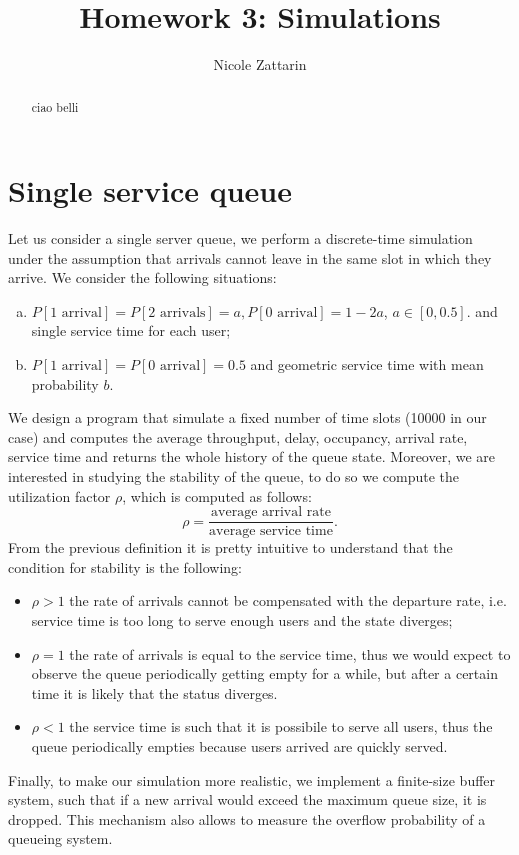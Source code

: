 \documentclass[twoside,onecolumn]{article}
\title{Homework 3: Simulations} %
\author{Nicole Zattarin}
\date{}
\theoremstyle{definition}
\begin{document}
\maketitle

\begin{abstract}
ciao belli

\end{abstract}

\section{Single service queue}
Let us consider a single server queue, we perform a discrete-time simulation under the assumption that arrivals cannot leave in the same slot in which they arrive. We consider the following situations:
\begin{enumerate}[(a)]
\item $P[\text{1 arrival}]=P[\text{2 arrivals}]=a, P[\text{0 arrival}]=1-2a$, $a\in [0,0.5].$ and single service time for each user;
\item $P[\text{1 arrival}]=P[\text{0 arrival}]=0.5$ and geometric service time with mean probability $b$. 
\end{enumerate}
We design a program that simulate a fixed number of time slots (10000 in our case) and computes the average throughput, delay, occupancy, arrival rate, service time and returns the whole history of the queue state. Moreover, we are interested in studying the stability of the queue, to do so we compute the utilization factor $\rho$, which is computed as follows:
\begin{equation}
\rho = \frac{\text{average arrival rate}}{\text{average service time}}.
\end{equation}
From the previous definition it is pretty intuitive to understand that the condition for stability is the following:
\begin{itemize}
\item $\rho>1$ the rate of arrivals cannot be compensated with the departure rate, i.e. service time is too long to serve enough users and the state diverges;
\item $\rho=1$ the rate of arrivals is equal to the service time, thus we would expect to observe the queue periodically getting empty for a while, but after a certain time it is likely that the status diverges.
\item $\rho<1$ the service time is such that it is possibile to serve all users, thus the queue periodically empties because users arrived are quickly served.
\end{itemize}
Finally, to make our simulation more realistic, we implement a finite-size buffer system, such that if a new arrival would exceed the maximum queue size, it is dropped. This mechanism also allows to measure the overflow probability of a queueing system.
\end{document}
